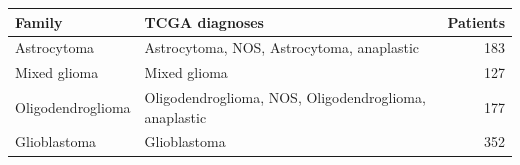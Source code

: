 \begin{tabular}{lp{8cm}r}
\toprule
\textbf{Family} & \textbf{TCGA diagnoses} & \textbf{Patients} \\
\midrule
Astrocytoma & Astrocytoma, NOS, Astrocytoma, anaplastic & 183 \\
Mixed glioma & Mixed glioma & 127 \\
Oligodendroglioma & Oligodendroglioma, NOS, Oligodendroglioma, anaplastic & 177 \\
Glioblastoma & Glioblastoma & 352 \\
\bottomrule
\end{tabular}
